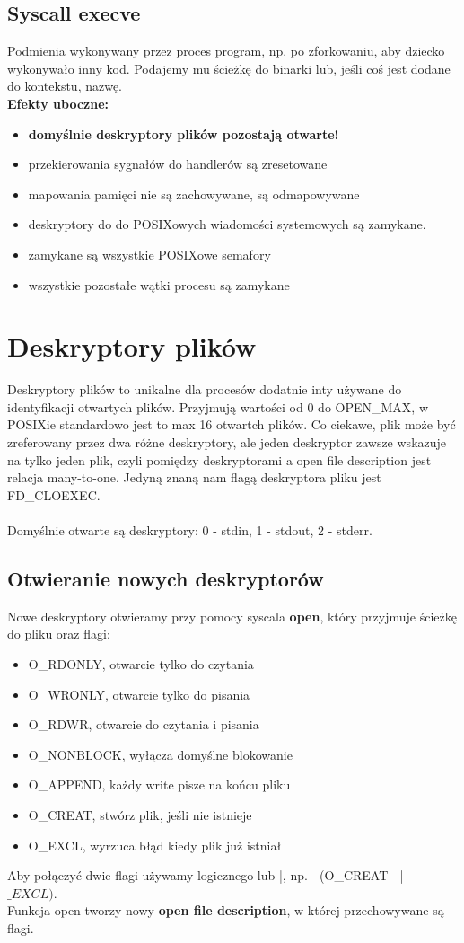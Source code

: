 \documentclass[12pt, a4paper, polish, openany]{book}
\begin{document}
\subsection{Syscall execve}
\label{execve}
Podmienia wykonywany przez proces program, np. po zforkowaniu, aby dziecko wykonywało inny kod. Podajemy mu ścieżkę do binarki lub, jeśli coś jest dodane do kontekstu, nazwę. \\
\textbf{Efekty uboczne:}
\begin{itemize}
  \item \textbf{domyślnie deskryptory plików pozostają otwarte!}
  \item przekierowania sygnałów do handlerów są zresetowane
  \item mapowania pamięci nie są zachowywane, są odmapowywane
  \item deskryptory do do POSIXowych wiadomości systemowych są zamykane.
  \item zamykane są wszystkie POSIXowe semafory
  \item wszystkie pozostałe wątki procesu są zamykane
\end{itemize}

\section{Deskryptory plików}
Deskryptory plików to unikalne dla procesów dodatnie inty używane do identyfikacji otwartych plików. Przyjmują wartości od 0 do OPEN\_MAX, w POSIXie standardowo jest to max 16 otwartch plików. Co ciekawe, plik może być zreferowany przez dwa różne deskryptory, ale jeden deskryptor zawsze wskazuje na tylko jeden plik, czyli pomiędzy deskryptorami a open file description jest relacja many-to-one. Jedyną znaną nam flagą deskryptora pliku jest FD\_CLOEXEC. \\\\
Domyślnie otwarte są deskryptory: 0 - stdin, 1 - stdout, 2 - stderr.
\subsection{Otwieranie nowych deskryptorów}
Nowe deskryptory otwieramy przy pomocy syscala \textbf{open}, który przyjmuje ścieżkę do pliku oraz flagi:
\begin{itemize}
  \item O\_RDONLY, otwarcie tylko do czytania
  \item O\_WRONLY, otwarcie tylko do pisania
  \item O\_RDWR, otwarcie do czytania i pisania
  \item O\_NONBLOCK, wyłącza domyślne blokowanie 
  \item O\_APPEND, każdy write pisze na końcu pliku
  \item O\_CREAT, stwórz plik, jeśli nie istnieje
  \item O\_EXCL, wyrzuca błąd kiedy plik już istniał
\end{itemize}
Aby połączyć dwie flagi używamy logicznego lub \xrightarrow[]{} |, np. $\;$ (O\_CREAT $\;$ | $\;$ $\_EXCL)$. \\
Funkcja open tworzy nowy \textbf{open file description}, w której przechowywane są flagi.
\end{document}
